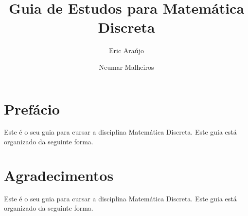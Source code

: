 \documentclass[12pt,a4paper,oneside]{book}
\begin{document}
\pagestyle{empty}
\title{Guia de Estudos para Matem\'atica Discreta}
\author{Eric Ara\'ujo \and Neumar Malheiros}
\maketitle


\pagestyle{fancy}
\fancyhf{}
\lhead[]{\thepage}
\rhead[\thepage]{}


\chapter*{Pref\'acio}

Este \'e o seu guia para cursar a disciplina Matem\'atica Discreta. Este guia est\'a organizado da seguinte forma.

\chapter*{Agradecimentos}

Este \'e o seu guia para cursar a disciplina Matem\'atica Discreta. Este guia est\'a organizado da seguinte forma.

\newpage
\renewcommand{\cftchapdotsep}{\cftdotsep}
\tableofcontents

% 











%




\end{document}
